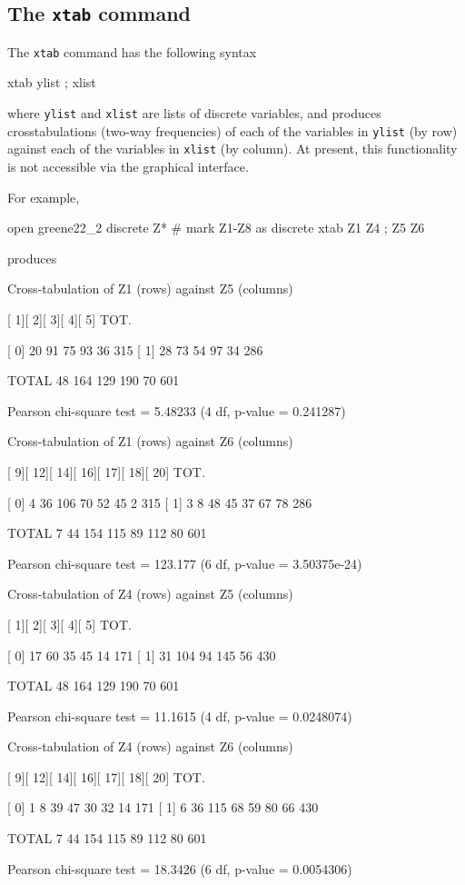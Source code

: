 \subsection{The \texttt{xtab} command}
\label{discr-xtab}

The \texttt{xtab} command has the following syntax
\begin{code}
  xtab ylist ; xlist
\end{code}
where \texttt{ylist} and \texttt{xlist} are lists of discrete
variables, and produces crosstabulations (two-way frequencies) of each
of the variables in \texttt{ylist} (by row) against each of the
variables in \texttt{xlist} (by column). At present, this
functionality is not accessible via the graphical interface.

For example, 
\begin{code}
  open greene22_2
  discrete Z* # mark Z1-Z8 as discrete
  xtab Z1 Z4 ; Z5 Z6
\end{code}
produces
\begin{code}
Cross-tabulation of Z1 (rows) against Z5 (columns)

       [   1][   2][   3][   4][   5]  TOT.
  
[   0]    20    91    75    93    36    315
[   1]    28    73    54    97    34    286

TOTAL     48   164   129   190    70    601

Pearson chi-square test = 5.48233 (4 df, p-value = 0.241287)

Cross-tabulation of Z1 (rows) against Z6 (columns)

       [   9][  12][  14][  16][  17][  18][  20]  TOT.
  
[   0]     4    36   106    70    52    45     2    315
[   1]     3     8    48    45    37    67    78    286

TOTAL      7    44   154   115    89   112    80    601

Pearson chi-square test = 123.177 (6 df, p-value = 3.50375e-24)

Cross-tabulation of Z4 (rows) against Z5 (columns)

       [   1][   2][   3][   4][   5]  TOT.
  
[   0]    17    60    35    45    14    171
[   1]    31   104    94   145    56    430

TOTAL     48   164   129   190    70    601

Pearson chi-square test = 11.1615 (4 df, p-value = 0.0248074)

Cross-tabulation of Z4 (rows) against Z6 (columns)

       [   9][  12][  14][  16][  17][  18][  20]  TOT.
  
[   0]     1     8    39    47    30    32    14    171
[   1]     6    36   115    68    59    80    66    430

TOTAL      7    44   154   115    89   112    80    601

Pearson chi-square test = 18.3426 (6 df, p-value = 0.0054306)
\end{code}

